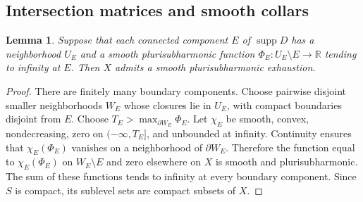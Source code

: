 \documentclass[11pt]{amsart}
\newtheorem{lemma}[theorem]{Lemma}
\theoremstyle{definition}
\theoremstyle{remark}
\numberwithin{equation}{section}
\newcommand{\R}{\mathbb R}
\newcommand{\supp}{\operatorname{supp}}
\begin{document}
\subsection{Intersection matrices and smooth collars}

\begin{lemma}\label{lem:surface-collar-gluing}
Suppose that each connected component $E$ of $\supp D$ has a
neighborhood $U_E$ and a smooth plurisubharmonic function
$\Phi_E:U_E\setminus E\to\R$ tending to infinity at $E$.  Then $X$
admits a smooth plurisubharmonic exhaustion.
\end{lemma}
\begin{proof}
There are finitely many boundary components.  Choose pairwise disjoint
smaller neighborhoods $W_E$ whose closures lie in $U_E$, with compact
boundaries disjoint from $E$.  Choose $T_E>\max_{\partial W_E}\Phi_E$.
Let $\chi_E$ be smooth, convex, nondecreasing, zero on
$(-\infty,T_E]$, and unbounded at infinity.  Continuity ensures that
$\chi_E(\Phi_E)$ vanishes on a neighborhood of $\partial W_E$.
Therefore the function equal to $\chi_E(\Phi_E)$ on $W_E\setminus E$
and zero elsewhere on $X$ is smooth and plurisubharmonic.  The sum of
these functions tends to infinity at every boundary component.  Since
$S$ is compact, its sublevel sets are compact subsets of $X$.
\end{proof}
\end{document}
